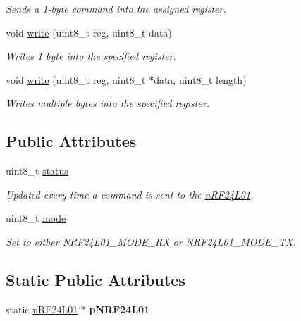 \begin{DoxyCompactItemize}
\begin{DoxyCompactList}\small\item\em Sends a 1-\/byte command into the assigned register. \end{DoxyCompactList}\item 
void \hyperlink{classn_r_f24_l01_a135a296739d60d269ca426a6f657cd63}{write} (uint8\-\_\-t reg, uint8\-\_\-t data)
\begin{DoxyCompactList}\small\item\em Writes 1 byte into the specified register. \end{DoxyCompactList}\item 
void \hyperlink{classn_r_f24_l01_aaa77ddee1a1d366f8008f6d897232942}{write} (uint8\-\_\-t reg, uint8\-\_\-t $\ast$data, uint8\-\_\-t length)
\begin{DoxyCompactList}\small\item\em Writes multiple bytes into the specified register. \end{DoxyCompactList}\end{DoxyCompactItemize}
\subsection*{Public Attributes}
\begin{DoxyCompactItemize}
\item 
\hypertarget{classn_r_f24_l01_aa47c2eea0705d99f9515043892a11f85}{uint8\-\_\-t \hyperlink{classn_r_f24_l01_aa47c2eea0705d99f9515043892a11f85}{status}}\label{classn_r_f24_l01_aa47c2eea0705d99f9515043892a11f85}

\begin{DoxyCompactList}\small\item\em Updated every time a command is sent to the \hyperlink{classn_r_f24_l01}{n\-R\-F24\-L01}. \end{DoxyCompactList}\item 
\hypertarget{classn_r_f24_l01_a9f4e136c7bf5375bd6a0543cc892ecce}{uint8\-\_\-t \hyperlink{classn_r_f24_l01_a9f4e136c7bf5375bd6a0543cc892ecce}{mode}}\label{classn_r_f24_l01_a9f4e136c7bf5375bd6a0543cc892ecce}

\begin{DoxyCompactList}\small\item\em Set to either N\-R\-F24\-L01\-\_\-\-M\-O\-D\-E\-\_\-\-R\-X or N\-R\-F24\-L01\-\_\-\-M\-O\-D\-E\-\_\-\-T\-X. \end{DoxyCompactList}\end{DoxyCompactItemize}
\subsection*{Static Public Attributes}
\begin{DoxyCompactItemize}
\item 
\hypertarget{classn_r_f24_l01_a0d5c6e79a32e4f792195a9aa5ae1b778}{static \hyperlink{classn_r_f24_l01}{n\-R\-F24\-L01} $\ast$ {\bfseries p\-N\-R\-F24\-L01}}\label{classn_r_f24_l01_a0d5c6e79a32e4f792195a9aa5ae1b778}

\end{DoxyCompactItemize}


